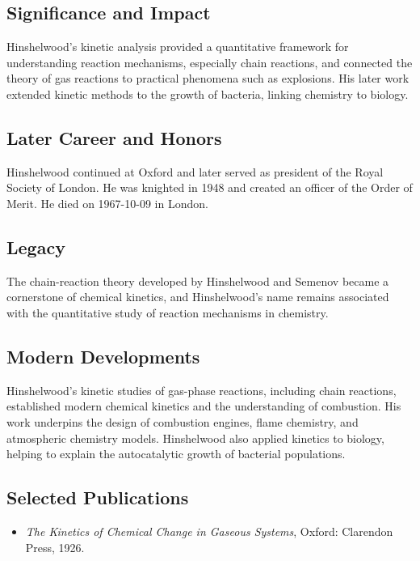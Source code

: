 \subsection*{Significance and Impact}

Hinshelwood's kinetic analysis provided a quantitative framework for understanding reaction mechanisms, especially chain reactions, and connected the theory of gas reactions to practical phenomena such as explosions. His later work extended kinetic methods to the growth of bacteria, linking chemistry to biology.

\subsection*{Later Career and Honors}

Hinshelwood continued at Oxford and later served as president of the Royal Society of London. He was knighted in 1948 and created an officer of the Order of Merit. He died on 1967-10-09 in London.

\subsection*{Legacy}

The chain-reaction theory developed by Hinshelwood and Semenov became a cornerstone of chemical kinetics, and Hinshelwood's name remains associated with the quantitative study of reaction mechanisms in chemistry.

\subsection*{Modern Developments}

Hinshelwood's kinetic studies of gas-phase reactions, including chain reactions, established modern chemical kinetics and the understanding of combustion. His work underpins the design of combustion engines, flame chemistry, and atmospheric chemistry models. Hinshelwood also applied kinetics to biology, helping to explain the autocatalytic growth of bacterial populations.

\subsection*{Selected Publications}

\begin{itemize}

\item \emph{The Kinetics of Chemical Change in Gaseous Systems}, Oxford: Clarendon Press, 1926.

\end{itemize}

